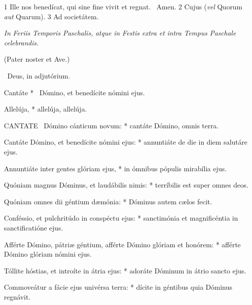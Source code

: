 
 1 Ille nos benedícat, qui sine fine vivit et regnat. \R\ Amen. 2 Cujus (\textit{vel} Quorum \textit{aut} Quarum). 3 Ad societátem.

\sectionornament




\textit{In Feriis Temporis Paschalis, atque in Festis extra et intra Tempus Paschale celebrandis.}

(Pater noster et Ave.)

\V\ Deus, in adjutórium.


 Cantáte * \textdagger\ Dómino, et benedícite nómini ejus.


 Allelúja, * allelúja, allelúja.


\lettrine[lines=2]{C}{ANTATE} \textdagger\ Dómino cánticum novum: * cantáte Dómino, omnis terra.

Cantáte Dómino, et benedícite nómini ejus: * annuntiáte de die in diem salutáre ejus.

Annuntiáte inter gentes glóriam ejus, * in ómnibus pópulis mirabília ejus.

Quóniam magnus Dóminus, et laudábilis nimis: * terríbilis est super omnes deos.

Quóniam omnes dii géntium dæmónia: * Dóminus autem cælos fecit.

Conféssio, et pulchritúdo in conspéctu ejus: * sanctimónia et magnificéntia in sanctificatióne ejus.

Afférte Dómino, pátriæ géntium, afférte Dómino glóriam et honórem: * afférte Dómino glóriam nómini ejus.

Tóllite hóstias, et introíte in átria ejus: * adoráte Dóminum in átrio sancto ejus.

Commoveátur a fácie ejus univérsa terra: * dícite in géntibus quia Dóminus regnávit.

